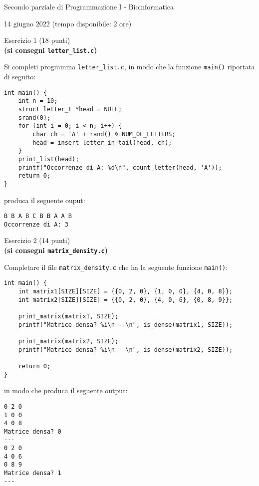 \documentclass[12pt]{article}
\begin{document}
\begin{center}{\LARGE Secondo parziale di Programmazione I - Bioinformatica}\\
\begin{center}
  \large 14 giugno 2022 (tempo disponibile: 2 ore)
\end{center}
\end{center}


\begin{center}{\Large Esercizio 1} ($18$ punti)\\
  \textbf{(si consegni \texttt{letter\_list.c})}\end{center}
Si completi programma \texttt{letter\_list.c}, in modo che la funzione \texttt{main()} riportata di seguito:
\begin{center}
\begin{lstlisting}[language=myC]
int main() {
    int n = 10;
    struct letter_t *head = NULL;
    srand(0);
    for (int i = 0; i < n; i++) {
        char ch = 'A' + rand() % NUM_OF_LETTERS;
        head = insert_letter_in_tail(head, ch);
    }
    print_list(head);
    printf("Occorrenze di A: %d\n", count_letter(head, 'A'));
    return 0;
}

\end{lstlisting}
\end{center}
produca il seguente ouput:
\begin{mdframed}[backgroundcolor=lightgrey] 
\begin{verbatim}
B B A B C B B A A B 
Occorrenze di A: 3
\end{verbatim}
\end{mdframed}


\newpage
\vspace*{8ex}
\begin{center}{\Large Esercizio 2} ($14$ punti)\\
  \textbf{(si consegni \texttt{matrix\_density.c})}
\end{center}
Completare il file \texttt{matrix\_density.c} che ha la seguente funzione \texttt{main()}:

\begin{lstlisting}[language=myC]
int main() {
    int matrix1[SIZE][SIZE] = {{0, 2, 0}, {1, 0, 0}, {4, 0, 8}};
    int matrix2[SIZE][SIZE] = {{0, 2, 0}, {4, 0, 6}, {0, 8, 9}};

    print_matrix(matrix1, SIZE);
    printf("Matrice densa? %i\n---\n", is_dense(matrix1, SIZE));

    print_matrix(matrix2, SIZE);
    printf("Matrice densa? %i\n---\n", is_dense(matrix2, SIZE));

    return 0;
}
\end{lstlisting}
in modo che produca il seguente output:
\begin{mdframed}[backgroundcolor=verylightgray] 
\begin{verbatim}
0 2 0 
1 0 0 
4 0 8 
Matrice densa? 0
---
0 2 0 
4 0 6 
0 8 9 
Matrice densa? 1
---
\end{verbatim}
\end{mdframed}
\end{document}

